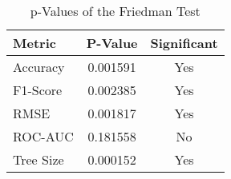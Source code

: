 
    \begin{table}[H]
        \centering
        \renewcommand{\arraystretch}{1.2}
        \caption{p-Values of the Friedman Test}
        \label{tab:RQ_Comparison_friedman}
    \begin{tabular}{lcc}
\toprule
Metric & P-Value & Significant \\
\midrule
Accuracy & 0.001591 & Yes \\
F1-Score & 0.002385 & Yes \\
RMSE & 0.001817 & Yes \\
ROC-AUC & 0.181558 & No \\
Tree Size & 0.000152 & Yes \\
\bottomrule
\end{tabular}

        
    \end{table}
    